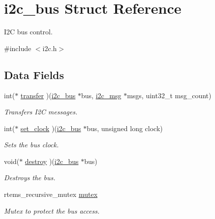 \hypertarget{structi2c__bus}{}\section{i2c\+\_\+bus Struct Reference}
\label{structi2c__bus}


I2C bus control.  




{\ttfamily \#include $<$i2c.\+h$>$}

\subsection*{Data Fields}
\begin{DoxyCompactItemize}
\item 
int($\ast$ \mbox{\hyperlink{structi2c__bus_ac32f1437ec3a0f45b21e7cd0cba50572}{transfer}} )(\mbox{\hyperlink{structi2c__bus}{i2c\+\_\+bus}} $\ast$bus, \mbox{\hyperlink{structi2c__msg}{i2c\+\_\+msg}} $\ast$msgs, uint32\+\_\+t msg\+\_\+count)
\begin{DoxyCompactList}\small\item\em Transfers I2C messages. \end{DoxyCompactList}\item 
int($\ast$ \mbox{\hyperlink{structi2c__bus_aba2252a8dc8354c1faf7c2ca97b71278}{set\+\_\+clock}} )(\mbox{\hyperlink{structi2c__bus}{i2c\+\_\+bus}} $\ast$bus, unsigned long clock)
\begin{DoxyCompactList}\small\item\em Sets the bus clock. \end{DoxyCompactList}\item 
void($\ast$ \mbox{\hyperlink{structi2c__bus_a3ab526a3de62eab7cc4419bd6c974685}{destroy}} )(\mbox{\hyperlink{structi2c__bus}{i2c\+\_\+bus}} $\ast$bus)
\begin{DoxyCompactList}\small\item\em Destroys the bus. \end{DoxyCompactList}\item 
\mbox{\label{structi2c__bus_a9d6c8ca0f1214537d9106798174883b2}} 
rtems\+\_\+recursive\+\_\+mutex \mbox{\hyperlink{structi2c__bus_a9d6c8ca0f1214537d9106798174883b2}{mutex}}
\begin{DoxyCompactList}\small\item\em Mutex to protect the bus access. \end{DoxyCompactList}\item 

\end{DoxyCompactItemize}
